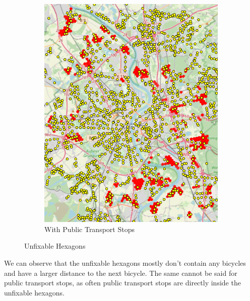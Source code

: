 \begin{figure}
\begin{subfigure}[b]{0.30\textwidth}
         \includegraphics[width=\textwidth]{Figures/results/problematic_hexagons/unfixable_with_stops.png}
         \caption{With Public Transport Stops}
         \label{fig:unfixable_with_stops}
     \end{subfigure}
     \hfill
     \caption{Unfixable Hexagons}
     \label{fig:unfixable_hexagons}
\end{figure}
We can observe that the unfixable hexagons mostly don't contain any bicycles and have a larger distance to the next bicycle.
The same cannot be said for public transport stops, as often public transport stops are directly inside the unfixable hexagons.

